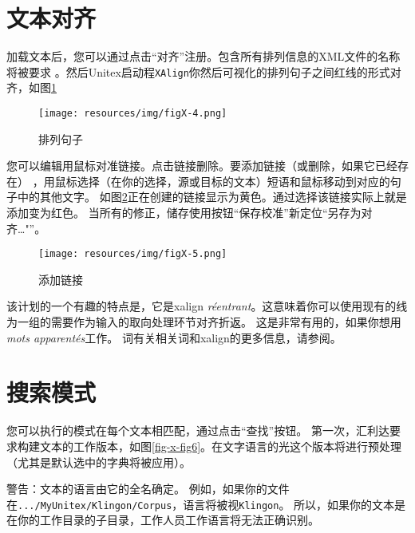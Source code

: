 \section{文本对齐}
加载文本后，您可以通过点击“对齐”注册。包含所有排列信息的XML文件的名称将被要求
。然后Unitex启动程\verb+XAlign+你然后可视化的排列句子之间红线的形式对齐，如图\ref{fig-x-links}

\begin{figure}[!ht]
\begin{center}
\texttt{[image: resources/img/figX-4.png]}
\caption{排列句子\label{fig-x-links}}
\end{center}
\end{figure}

\bigskip
\noindent 

您可以编辑用鼠标对准链接。点击链接删除。要添加链接（或删除，如果它已经存在）
，用鼠标选择（在你的选择，源或目标的文本）短语和鼠标移动到对应的句子中的其他文字。
如图\ref{fig-x-adding-a-link}正在创建的链接显示为黄色。通过选择该链接实际上就是添加变为红色。
当所有的修正，储存使用按钮“保存校准”新定位“另存为对齐\ldots"”。

\begin{figure}[!ht]
\begin{center}
\texttt{[image: resources/img/figX-5.png]}
\caption{添加链接\label{fig-x-adding-a-link}}
\end{center}
\end{figure}

\bigskip
\noindent  该计划的一个有趣的特点是，它是xalign
\textit{réentrant}。这意味着你可以使用现有的线为一组的需要作为输入的取向处理环节对齐折返。
这是非常有用的，如果你想用\textit{mots apparentés}工作。
词有关相关词和xalign的更多信息，请参阅\cite{IGML_PauDum08}。
\clearpage
\section{搜索模式}

您可以执行的模式在每个文本相匹配，通过点击“查找”按钮。
第一次，汇利达要求构建文本的工作版本，如图\ref{fig-x-fig6}。在文字语言的光这个版本将进行预处理（尤其是默认选中的字典将被应用）。


\bigskip
\noindent 警告：文本的语言由它的全名确定。
例如，如果你的文件在\verb+.../MyUnitex/Klingon/Corpus+，语言将被视\verb+Klingon+。
所以，如果你的文本是在你的工作目录的子目录，工作人员工作语言将无法正确识别。

